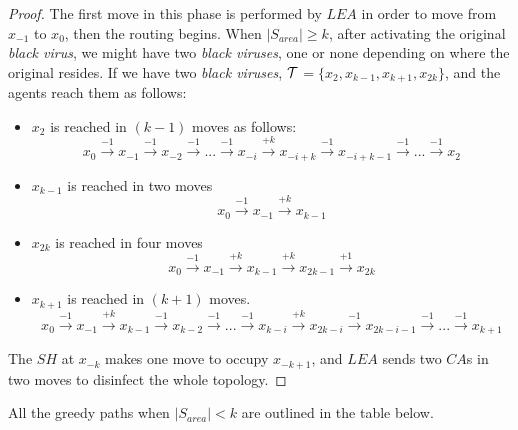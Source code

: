 \begin{proof}
The first move in this phase is performed by $LEA$ in order to move from $x_{-1}$ to $x_0$, then the routing begins. When  $\left\vert{S_{area}}\right\vert \ge k$, after activating the original {\it black virus}, we might have two {\it black viruses}, one \bv or none depending on where the original \bv resides.
If we have two {\it black viruses}, ${\cal T}$$=\{x_{2},x_{k-1},x_{k+1},x_{2k}\}$, and the agents reach them as follows:
\begin{itemize}
\item $x_{2}$ is reached in $(k-1)$ moves as follows:
$$x_{0} \xrightarrow {-1} x_{-1} \xrightarrow {-1} x_{-2} \xrightarrow {-1}... \xrightarrow {-1} x_{-i} \xrightarrow {+k} x_{-i+k} \xrightarrow {-1} x_{-i+k-1} \xrightarrow {-1} ... \xrightarrow {-1} x_{2}$$
\item $x_{k-1}$ is reached in two moves
$$x_{0} \xrightarrow {-1} x_{-1} \xrightarrow {+k} x_{k-1}$$
\item $x_{2k}$ is reached in four moves
$$x_{0} \xrightarrow {-1} x_{-1} \xrightarrow {+k} x_{k-1} \xrightarrow {+k} x_{2k-1} \xrightarrow {+1} x_{2k}$$
\item $x_{k+1}$ is reached in $(k+1)$ moves.
$$x_{0} \xrightarrow {-1} x_{-1} \xrightarrow {+k} x_{k-1} \xrightarrow {-1} x_{k-2} \xrightarrow {-1} ... \xrightarrow {-1} x_{k-i} \xrightarrow {+k} x_{2k-i} \xrightarrow {-1} x_{2k-i-1} \xrightarrow {-1} ... \xrightarrow {-1} x_{k+1}$$
\end{itemize}
The $SH$ at $x_{-k}$ makes one move to occupy $x_{-k+1}$, and $LEA$ sends two $CA$s in two moves to disinfect the whole topology.
 
\end{proof}

\noindent All the greedy paths when $\left\vert{S_{area}}\right\vert < k$ are outlined in the table below.

